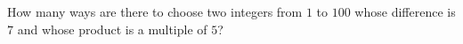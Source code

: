 How many ways are there to choose two integers from $1$ to $100$ whose difference is $7$ and whose product is a multiple of $5$?
